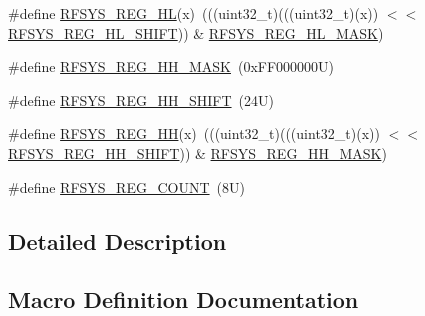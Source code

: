 \begin{DoxyCompactItemize}
\item 
\#define \mbox{\hyperlink{group___r_f_s_y_s___register___masks_gaea8beedf47675b6b2c630526a03d90e5}{R\+F\+S\+Y\+S\+\_\+\+R\+E\+G\+\_\+\+HL}}(x)~(((uint32\+\_\+t)(((uint32\+\_\+t)(x)) $<$$<$ \mbox{\hyperlink{group___r_f_s_y_s___register___masks_gabc34a2d1963a697d1a773a8981a063f5}{R\+F\+S\+Y\+S\+\_\+\+R\+E\+G\+\_\+\+H\+L\+\_\+\+S\+H\+I\+FT}})) \& \mbox{\hyperlink{group___r_f_s_y_s___register___masks_ga063f595b6c7267627c96048590611cc1}{R\+F\+S\+Y\+S\+\_\+\+R\+E\+G\+\_\+\+H\+L\+\_\+\+M\+A\+SK}})
\item 
\#define \mbox{\hyperlink{group___r_f_s_y_s___register___masks_gae1fb55483b3d79a2e74d0c1ad4e57d51}{R\+F\+S\+Y\+S\+\_\+\+R\+E\+G\+\_\+\+H\+H\+\_\+\+M\+A\+SK}}~(0x\+F\+F000000\+U)
\item 
\#define \mbox{\hyperlink{group___r_f_s_y_s___register___masks_gae78b067bd28db1d0ff57015f300312fb}{R\+F\+S\+Y\+S\+\_\+\+R\+E\+G\+\_\+\+H\+H\+\_\+\+S\+H\+I\+FT}}~(24\+U)
\item 
\#define \mbox{\hyperlink{group___r_f_s_y_s___register___masks_ga9724177c60594bb3a22f13e9ef7de07c}{R\+F\+S\+Y\+S\+\_\+\+R\+E\+G\+\_\+\+HH}}(x)~(((uint32\+\_\+t)(((uint32\+\_\+t)(x)) $<$$<$ \mbox{\hyperlink{group___r_f_s_y_s___register___masks_gae78b067bd28db1d0ff57015f300312fb}{R\+F\+S\+Y\+S\+\_\+\+R\+E\+G\+\_\+\+H\+H\+\_\+\+S\+H\+I\+FT}})) \& \mbox{\hyperlink{group___r_f_s_y_s___register___masks_gae1fb55483b3d79a2e74d0c1ad4e57d51}{R\+F\+S\+Y\+S\+\_\+\+R\+E\+G\+\_\+\+H\+H\+\_\+\+M\+A\+SK}})
\item 
\#define \mbox{\hyperlink{group___r_f_s_y_s___register___masks_gafacec8fbd6ebad90fb7b4ac0e45b7e9a}{R\+F\+S\+Y\+S\+\_\+\+R\+E\+G\+\_\+\+C\+O\+U\+NT}}~(8\+U)
\end{DoxyCompactItemize}


\subsection{Detailed Description}


\subsection{Macro Definition Documentation}
\mbox{\label{group___r_f_s_y_s___register___masks_ga83a5a75f5421c69ce93437b8be3c1144}} 
